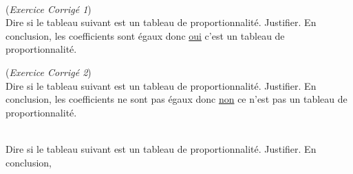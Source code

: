 





\phantom{0} \\
\exercice (\textit{Exercice Corrigé 1}) \\
Dire si le tableau suivant est un tableau de proportionnalité. Justifier.
 En conclusion, les coefficients sont égaux donc \underline{oui} c'est un tableau de proportionnalité.

\exercice (\textit{Exercice Corrigé 2}) \\
Dire si le tableau suivant est un tableau de proportionnalité. Justifier.
 En conclusion, les coefficients ne sont pas égaux donc \underline{non} ce n'est pas un tableau de proportionnalité.

\exercice \diff[1] \\
Dire si le tableau suivant est un tableau de proportionnalité. Justifier.
 En conclusion, \dotfill \\ \dtf


